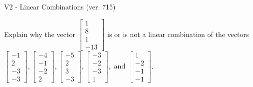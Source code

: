 \begin{exercise}
  \begin{exerciseTitle}V2 - Linear Combinations (ver. 715)\end{exerciseTitle}
  \begin{exerciseStatement}
    Explain why the vector \(\left[\begin{array}{c}
1 \\
8 \\
1 \\
-13
\end{array}\right]\)  is or is not a linear 
	combination of the vectors \(\left[\begin{array}{c}
-1 \\
2 \\
-3 \\
-3
\end{array}\right] , \left[\begin{array}{c}
-4 \\
-1 \\
-2 \\
2
\end{array}\right] , \left[\begin{array}{c}
-5 \\
2 \\
3 \\
-3
\end{array}\right] , \left[\begin{array}{c}
-3 \\
-2 \\
-3 \\
1
\end{array}\right] , \text{ and } \left[\begin{array}{c}
1 \\
-2 \\
-1 \\
-1
\end{array}\right]\).
	



\end{exerciseStatement}
\end{exercise}
